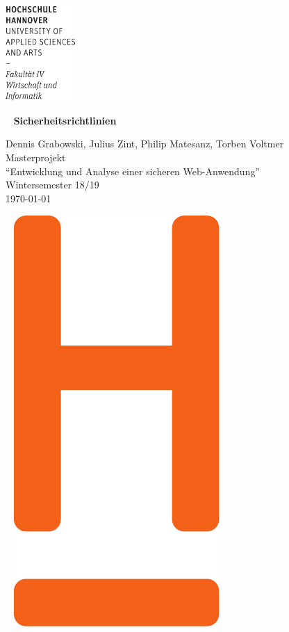 \documentclass[12pt,DIV14,BCOR10mm,a4paper,parskip=half-,english,ngerman,bibliography=totocnumbered]{scrreprt}
\begin{document}
  \thispagestyle{empty} %
\includegraphics[width=0.2\textwidth]{Wortmarke_WI_schwarz}

   {  ~ \sffamily
  \vfill
  {\Huge\bfseries Sicherheitsrichtlinien}
  \bigskip

  {\Large
  Dennis Grabowski, Julius Zint, Philip Matesanz, Torben Voltmer \\[2ex]
  Masterprojekt \\
  \enquote{Entwicklung und Analyse einer sicheren Web-Anwendung} \\
  Wintersemester 18/19\makeatletter
  \patchcmd{\scr@startchapter}{\if@openright\cleardoublepage\else\clearpage\fi}{}{}{}
  \makeatother
 \\[5ex]
   \today }
}
 \vfill

  ~ \hfill
  \includegraphics[height=0.3\paperheight]{H_WI_Pantone1665}
\end{document}
